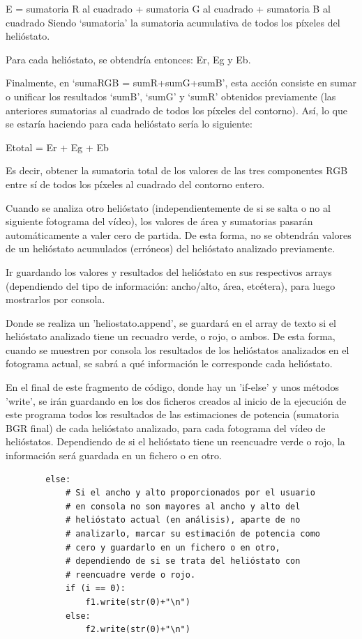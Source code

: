E = sumatoria R al cuadrado + sumatoria G al cuadrado + sumatoria B al cuadrado
Siendo ‘sumatoria’ la sumatoria acumulativa de todos los píxeles del helióstato.

Para cada helióstato, se obtendría entonces: Er, Eg y Eb.
           
Finalmente, en ‘sumaRGB = sumR+sumG+sumB’, esta acción consiste en sumar o unificar los resultados ‘sumB’, ‘sumG’ y ‘sumR’ obtenidos previamente (las anteriores sumatorias al cuadrado de todos los píxeles del contorno). Así, lo que se estaría haciendo para cada helióstato sería lo siguiente:

Etotal = Er + Eg + Eb

Es decir, obtener la sumatoria total de los valores de las tres componentes RGB entre sí de todos los píxeles al cuadrado del contorno entero.

Cuando se analiza otro helióstato (independientemente de si se salta o no al siguiente fotograma del vídeo), los valores de área y sumatorias pasarán automáticamente a valer cero de partida. De esta forma, no se obtendrán valores de un helióstato acumulados (erróneos) del helióstato analizado previamente.

Ir guardando los valores y resultados del helióstato en sus respectivos arrays (dependiendo del tipo de información: ancho/alto, área, etcétera), para luego mostrarlos por consola.

Donde se realiza un 'heliostato.append', se guardará en el array de texto si el helióstato analizado tiene un recuadro verde, o rojo, o ambos. De esta forma, cuando se muestren por consola los resultados de los helióstatos analizados en el fotograma actual, se sabrá a qué información le corresponde cada helióstato.

En el final de este fragmento de código, donde hay un 'if-else' y unos métodos 'write', se irán guardando en los dos ficheros creados al inicio de la ejecución de este programa todos los resultados de las estimaciones de potencia (sumatoria BGR final) de cada helióstato analizado, para cada fotograma del vídeo de helióstatos. Dependiendo de si el helióstato tiene un reencuadre verde o rojo, la información será guardada en un fichero o en otro.\\[20pt]

\begin{lstlisting}
		else:
            # Si el ancho y alto proporcionados por el usuario
            # en consola no son mayores al ancho y alto del
            # helióstato actual (en análisis), aparte de no
            # analizarlo, marcar su estimación de potencia como
            # cero y guardarlo en un fichero o en otro,
            # dependiendo de si se trata del helióstato con
            # reencuadre verde o rojo.
            if (i == 0):
                f1.write(str(0)+"\n")
            else:
                f2.write(str(0)+"\n")
\end{lstlisting}
                

